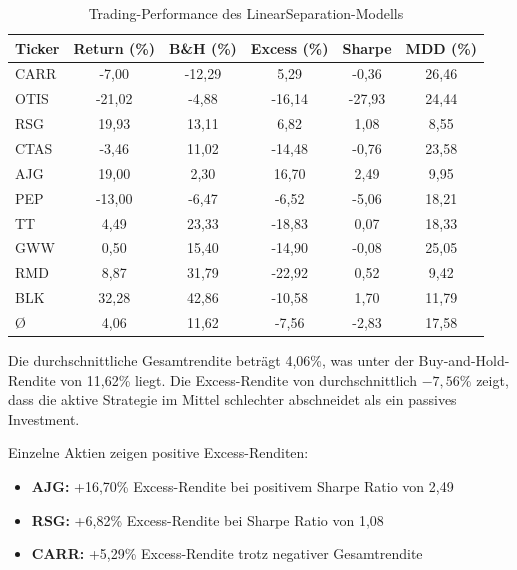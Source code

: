 \begin{table}[htbp]
    \centering
    \begin{tabular}{l S[table-format=-2.2] S[table-format=2.2] S[table-format=-2.2] S[table-format=-2.2] S[table-format=2.2]}
        \toprule
        Ticker & {Return (\%)} & {B\&H (\%)} & {Excess (\%)} & {Sharpe} & {MDD (\%)} \\
        \midrule
        CARR   & -7,00         & -12,29      & 5,29          & -0,36    & 26,46      \\
        OTIS   & -21,02        & -4,88       & -16,14        & -27,93   & 24,44      \\
        RSG    & 19,93         & 13,11       & 6,82          & 1,08     & 8,55       \\
        CTAS   & -3,46         & 11,02       & -14,48        & -0,76    & 23,58      \\
        AJG    & 19,00         & 2,30        & 16,70         & 2,49     & 9,95       \\
        PEP    & -13,00        & -6,47       & -6,52         & -5,06    & 18,21      \\
        TT     & 4,49          & 23,33       & -18,83        & 0,07     & 18,33      \\
        GWW    & 0,50          & 15,40       & -14,90        & -0,08    & 25,05      \\
        RMD    & 8,87          & 31,79       & -22,92        & 0,52     & 9,42       \\
        BLK    & 32,28         & 42,86       & -10,58        & 1,70     & 11,79      \\
        \midrule
        \O     & 4,06          & 11,62       & -7,56         & -2,83    & 17,58      \\
        \bottomrule
    \end{tabular}
    \caption{Trading-Performance des LinearSeparation-Modells}\label{tab:ls_trading}
\end{table}

Die durchschnittliche Gesamtrendite beträgt 4,06\%, was unter der Buy-and-Hold-Rendite von 11,62\% liegt. Die Excess-Rendite von durchschnittlich $-7,56\%$ zeigt, dass die aktive Strategie im Mittel schlechter abschneidet als ein passives Investment.

Einzelne Aktien zeigen positive Excess-Renditen:
\begin{itemize}
    \item \textbf{AJG:} +16,70\% Excess-Rendite bei positivem Sharpe Ratio von 2,49
    \item \textbf{RSG:} +6,82\% Excess-Rendite bei Sharpe Ratio von 1,08
    \item \textbf{CARR:} +5,29\% Excess-Rendite trotz negativer Gesamtrendite
\end{itemize}

